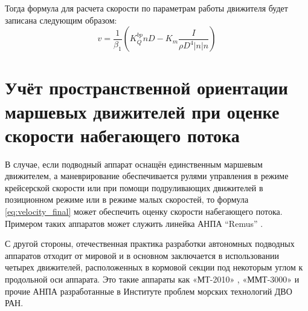 

Тогда формула для расчета скорости по параметрам работы движителя будет записана следующим образом:
\begin{equation}
    \label{eq:velocity_final}
    v = \frac{1}{\beta_1} \left( K_Q^{bp} n D - K_m\frac{I}{\rho D^4|n|n} \right)
\end{equation}

\section{Учёт пространственной ориентации маршевых движителей при оценке скорости набегающего потока}
В случае, если подводный аппарат оснащён единственным маршевым движителем, а маневрирование обеспечивается рулями управления в режиме крейсерской скорости или при помощи подруливающих движителей в позиционном режиме или в режиме малых скоростей, то формула \ref{eq:velocity_final} может обеспечить оценку скорости набегающего потока.
Примером таких аппаратов может служить линейка АНПА ``Remus'' \cite{allen1997remus, kukulya2010under}.

С другой стороны, отечественная практика разработки автономных подводных аппаратов отходит от мировой и в основном заключается в использовании четырех движителей, расположенных в кормовой секции под некоторым углом к продольной оси аппарата.
Это такие аппараты как «МТ-2010» \cite{борейко2011малогабаритный}, «ММТ-3000» \cite{горнак2007ммт} и прочие АНПА разработанные в Институте проблем морских технологий ДВО РАН. 

